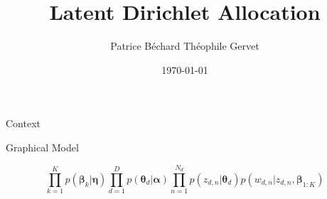 \documentclass{beamer}
\title[Your Short Title]{\Huge Latent Dirichlet Allocation}
\author{\Large Patrice B\'echard \quad Th\'eophile Gervet}
\institute{\normalsize Universit\'e de Montr\'eal}
\date{\Large \today}
\begin{document}
%
%

\begin{frame}
  \titlepage
\end{frame}

%
%

\begin{frame}{Context}
\noindent{}
\end{frame}

%
%

\begin{frame}{Graphical Model}

\vspace{0.5cm}

\noindent{}
\vspace{-0.5cm}
\Large{
$$
\prod_{k=1}^{K} p (\bm{\beta}_k|\bm{\eta}) \prod_{d=1}^{D} p(\bm{\theta}_d|\bm{\alpha})\prod_{n=1}^{N_d} p(z_{d,n}|\bm{\theta}_d)p(w_{d,n}|z_{d,n},\bm{\beta}_{1:K})
$$
}
\end{frame}

%
%
\end{document}
